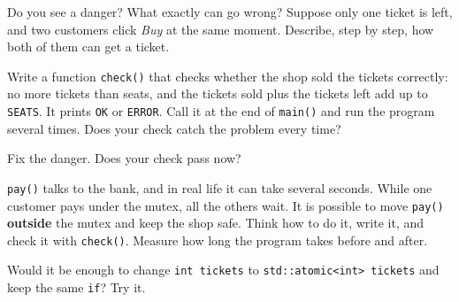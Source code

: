 \begin{questions}
  \item Do you see a danger? What exactly can go wrong? Suppose only one ticket is left, and two customers
        click \emph{Buy} at the same moment. Describe, step by step, how both of them can get a ticket.
  \item Write a function \texttt{check()} that checks whether the shop sold the tickets correctly: no more tickets
        than seats, and the tickets sold plus the tickets left add up to \texttt{SEATS}. It prints \texttt{OK} or
        \texttt{ERROR}. Call it at the end of \texttt{main()} and run the program several times.
        Does your check catch the problem every time?
  \item Fix the danger. Does your check pass now?
  \item \texttt{pay()} talks to the bank, and in real life it can take several seconds. While one customer pays
        under the mutex, all the others wait. It is possible to move \texttt{pay()} \textbf{outside} the mutex and keep
        the shop safe. Think how to do it, write it, and check it with \texttt{check()}.
        Measure how long the program takes before and after.
  \item Would it be enough to change \texttt{int tickets} to \texttt{std::atomic<int> tickets} and keep the
        same \texttt{if}? Try it.
\end{questions}
